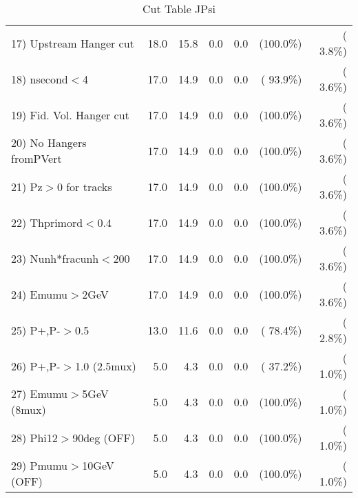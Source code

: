 \begin{table}[h!]
\begin{tabular}{||l||r|r|r|r|r|r||}
 17) Upstream Hanger cut  &         18.0 &         15.8 &          0.0 &          0.0 & (100.0\%) & (  3.8\%) \\
 18) nsecond$<$4          &         17.0 &         14.9 &          0.0 &          0.0 & ( 93.9\%) & (  3.6\%) \\
 19) Fid. Vol. Hanger cut &         17.0 &         14.9 &          0.0 &          0.0 & (100.0\%) & (  3.6\%) \\
 20) No Hangers fromPVert &         17.0 &         14.9 &          0.0 &          0.0 & (100.0\%) & (  3.6\%) \\
 21) Pz$>$0 for tracks    &         17.0 &         14.9 &          0.0 &          0.0 & (100.0\%) & (  3.6\%) \\
 22) Thprimord$<$0.4      &         17.0 &         14.9 &          0.0 &          0.0 & (100.0\%) & (  3.6\%) \\
 23) Nunh*fracunh$<$200   &         17.0 &         14.9 &          0.0 &          0.0 & (100.0\%) & (  3.6\%) \\
 24) Emumu$>$2GeV         &         17.0 &         14.9 &          0.0 &          0.0 & (100.0\%) & (  3.6\%) \\
 25) P+,P-$>$0.5          &         13.0 &         11.6 &          0.0 &          0.0 & ( 78.4\%) & (  2.8\%) \\
 26) P+,P-$>$1.0 (2.5mux) &          5.0 &          4.3 &          0.0 &          0.0 & ( 37.2\%) & (  1.0\%) \\
 27) Emumu$>$5GeV  (8mux) &          5.0 &          4.3 &          0.0 &          0.0 & (100.0\%) & (  1.0\%) \\
 28) Phi12$>$90deg  (OFF) &          5.0 &          4.3 &          0.0 &          0.0 & (100.0\%) & (  1.0\%) \\
 29) Pmumu$>$10GeV  (OFF) &          5.0 &          4.3 &          0.0 &          0.0 & (100.0\%) & (  1.0\%) \\
 \hline
 \hline
 \end{tabular}
 \caption{Cut Table  JPsi     }
 \label{tab-cutcohjpsi-mumu_jpsi}
 \end{table}
